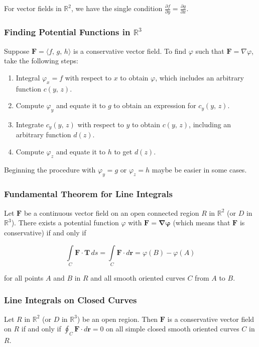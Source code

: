 For vector fields in $\mathbb{R}^2$, we have the single condition $\frac{\partial f}{\partial y} = \frac{\partial g}{\partial x}$.


\subsubsection{Finding Potential Functions in $\mathbb{R}^3$}
Suppose $\mathbf{F} = \langle f,\, g,\, h \rangle$ is a conservative vector field. To find $\varphi$ such that $\mathbf{F} = \nabla \varphi$, take the following steps:

\begin{enumerate}
    \item Integral $\varphi _x = f$ with respect to $x$ to obtain $\varphi$, which includes an arbitrary function $c(y,\, z)$.
    \item Compute $\varphi _y$ and equate it to $g$ to obtain an expression for $c_y (y,\, z)$.
    \item Integrate $c_y (y,\, z)$ with respect to $y$ to obtain $c(y,\, z)$, including an arbitrary function $d(z)$.
    \item Compute $\varphi _z$ and equate it to $h$ to get $d(z)$.
\end{enumerate}

Beginning the procedure with $\varphi _y = g$ or $\varphi _z = h$ maybe be easier in some cases.

\subsubsection{Fundamental Theorem for Line Integrals}
Let $\mathbf{F}$ be a continuous vector field on an open connected region $R$ in $\mathbb{R}^2$ (or $D$ in $\mathbb{R}^3$). There exists a potential function $\varphi$ with $\mathbf{F = \nabla \varphi}$ (which means that $\mathbf{F}$ is conservative) if and only if

\begin{equation}
    \int \limits _C \mathbf{F \cdot T} \, ds = \int \limits _C \mathbf{F} \cdot d\mathbf{r} = \varphi (B) - \varphi(A)
\end{equation}

for all points $A$ and $B$ in $R$ and all smooth oriented curves $C$ from $A$ to $B$.

\subsubsection{Line Integrals on Closed Curves}
Let $R$ in $\mathbb{R}^2$ (or $D$ in $\mathbb{R}^3$) be an open region. Then $\mathbf{F}$ is a conservative vector field on $R$ if and only if $\oint _C \mathbf{F} \cdot d\mathbf{r} = 0$ on all simple closed smooth oriented curves $C$ in $R$.
